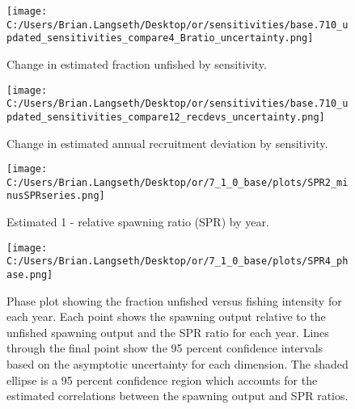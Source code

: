 \documentclass[11pt,
  english,
  a4paper,
]{article}
\begin{document}
\tagmcend\tagstructend


\begin{figure}
\centering
\texttt{[image: C:/Users/Brian.Langseth/Desktop/or/sensitivities/base.710\_updated\_sensitivities\_compare4\_Bratio\_uncertainty.png]}
\caption{Change in estimated fraction unfished by sensitivity.\label{fig:sens-depl}}
\end{figure}

\tagmcend\tagstructend


\begin{figure}
\centering
\texttt{[image: C:/Users/Brian.Langseth/Desktop/or/sensitivities/base.710\_updated\_sensitivities\_compare12\_recdevs\_uncertainty.png]}
\caption{Change in estimated annual recruitment deviation by sensitivity.\label{fig:sens-recdev}}
\end{figure}

\tagmcend\tagstructend


\begin{figure}
\centering
\texttt{[image: C:/Users/Brian.Langseth/Desktop/or/7\_1\_0\_base/plots/SPR2\_minusSPRseries.png]}
\caption{Estimated 1 - relative spawning ratio (SPR) by year.\label{fig:1-spr}}
\end{figure}

\tagmcend\tagstructend


\begin{figure}
\centering
\texttt{[image: C:/Users/Brian.Langseth/Desktop/or/7\_1\_0\_base/plots/SPR4\_phase.png]}
\caption{Phase plot showing the fraction unfished versus fishing intensity for each year. Each point shows the spawning output relative to the unfished spawning output and the SPR ratio for each year. Lines through the final point show the 95 percent confidence intervals based on the asymptotic uncertainty for each dimension. The shaded ellipse is a 95 percent confidence region which accounts for the estimated correlations between the spawning output and SPR ratios.\label{fig:phase-plot}}
\end{figure}
\end{document}
